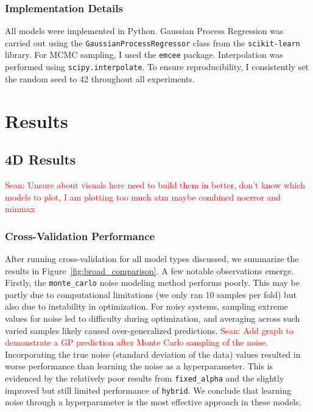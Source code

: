\documentclass[11pt]{article}
\newcommand{\Sean}[1]{{\textcolor{red}{{Sean: #1}} }}
\begin{document}
\subsubsection*{Implementation Details}
All models were implemented in Python. Gaussian Process Regression was carried out using the \texttt{GaussianProcessRegressor} class from the \texttt{scikit-learn} library.
For MCMC sampling, I used the \texttt{emcee} package. Interpolation was performed using \texttt{scipy.interpolate}. To ensure reproducibility, I consistently set the random seed to 42 throughout all experiments.



\section{Results}
\subsection{4D Results}
\Sean{Unsure about visuals here need to build them in better, don't know which models to plot, I am plotting too much atm maybe combined noerror and minmax}

\subsubsection*{Cross-Validation Performance}

After running cross-validation for all model types discussed, we summarize the results in Figure~\ref{fig:broad_comparison}. A few notable observations emerge. Firstly, the \texttt{monte\_carlo} noise modeling method performs poorly.
This may be partly due to computational limitations (we only ran 10 samples per fold) but also due to instability in optimization. For noisy systems, sampling extreme values for noise led to difficulty during optimization, 
and averaging across such varied samples likely caused over-generalized predictions. \Sean{Add graph to demonstrate a GP prediction after Monte Carlo sampling of the noise.}
Incorporating the true noise (standard deviation of the data) values resulted in worse performance than learning the noise as a hyperparameter.
This is evidenced by the relatively poor results from \texttt{fixed\_alpha} and the slightly improved but still limited performance of \texttt{hybrid}.
We conclude that learning noise through a hyperparameter is the most effective approach in these models.
\end{document}
